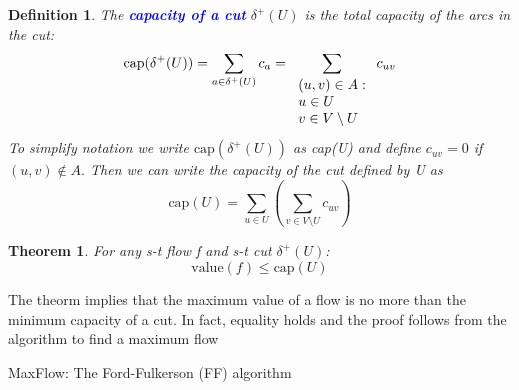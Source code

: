 \documentclass[10pt]{report}
\makeatletter
\numberwithin{dummy}{section}
\theoremstyle{ocrenumbox}
\newtheorem{definitionTTT}{Theorem}[]
\theoremstyle{grayman}
\newtheorem{definitionTTTT}{Definition}[]
\newenvironment{thm}{\begin{tBox}\begin{definitionTTT}}{\end{definitionTTT}\end{tBox}}
\newenvironment{voc}{\begin{vBox}\begin{definitionTTTT}}{\end{definitionTTTT}\end{vBox}}
\renewcommand{\subsection}{\@startsection {subsection}{2}{\z@}
{-3ex \@plus -0.1ex \@minus -.4ex}
{0.5ex \@plus.2ex }
{\normalfont\sffamily\bfseries}}
\makeatother
\begin{document}
\begin{voc}
    The \textbf{\textcolor{blue}{capacity of a cut}} $\delta^+(U)$ is the total capacity of the arcs in the cut:
    \[\mbox{cap}(\delta^+(U))= \sum_{a \in \delta^+(U)} c_a = \sum_{\begin{tabular}{l}
    $(u,v) \in A:$   \\
    $u\in U $\\$ v\in V\setminus U$
\end{tabular}} c_{uv} \]
To simplify notation we write $\mbox{cap}(\delta^+(U))$ as cap(U) and define $c_{uv} = 0$ if
$(u, v) \notin A.$ Then we can write the capacity of the cut defined by U as
\[\mbox{cap}(U) = \sum_{u \in U}  \left( \sum_{v \in V\setminus U} c_{uv} \right)\]
\end{voc}

\begin{thm}
    For any s-t flow f and s-t cut $\delta^+(U)$:
\[\mbox{value}(f) \leq \mbox{cap}(U)\]
\end{thm}
The theorm implies that the maximum value of a flow is no more than the
minimum capacity of a cut. In fact, equality holds and the proof follows
from the algorithm to find a maximum flow

\subsection{MaxFlow: The Ford-Fulkerson (FF) algorithm}
\end{document}
